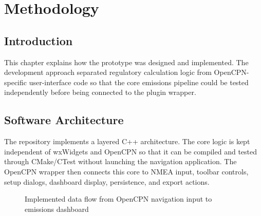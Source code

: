 \chapter{Methodology}
\label{chap:methodology}

\section{Introduction}
This chapter explains how the prototype was designed and implemented. The development approach separated regulatory calculation logic from OpenCPN-specific user-interface code so that the core emissions pipeline could be tested independently before being connected to the plugin wrapper.

\section{Software Architecture}
The repository implements a layered C++ architecture. The core logic is kept independent of wxWidgets and OpenCPN so that it can be compiled and tested through CMake/CTest without launching the navigation application. The OpenCPN wrapper then connects this core to NMEA input, toolbar controls, setup dialogs, dashboard display, persistence, and export actions.

\begin{figure}[H]
\centering
{}
\caption{Implemented data flow from OpenCPN navigation input to emissions dashboard}
\label{fig:system-architecture}
\end{figure}

